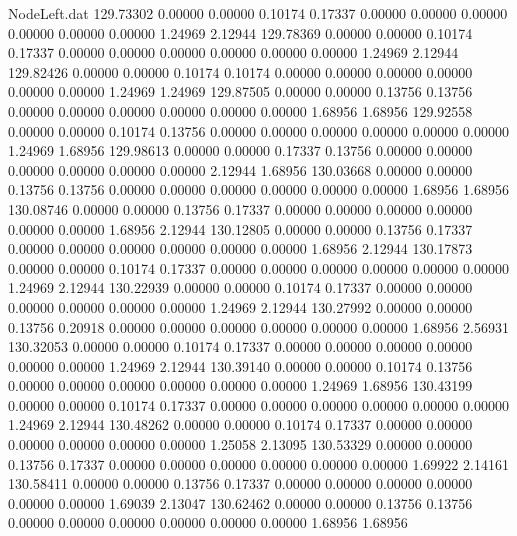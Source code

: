 \begin{filecontents}{NodeLeft.dat}
 129.73302    0.00000    0.00000     0.10174    0.17337    0.00000    0.00000    0.00000    0.00000    0.00000    0.00000    1.24969    2.12944
 129.78369    0.00000    0.00000     0.10174    0.17337    0.00000    0.00000    0.00000    0.00000    0.00000    0.00000    1.24969    2.12944
 129.82426    0.00000    0.00000     0.10174    0.10174    0.00000    0.00000    0.00000    0.00000    0.00000    0.00000    1.24969    1.24969
 129.87505    0.00000    0.00000     0.13756    0.13756    0.00000    0.00000    0.00000    0.00000    0.00000    0.00000    1.68956    1.68956
 129.92558    0.00000    0.00000     0.10174    0.13756    0.00000    0.00000    0.00000    0.00000    0.00000    0.00000    1.24969    1.68956
 129.98613    0.00000    0.00000     0.17337    0.13756    0.00000    0.00000    0.00000    0.00000    0.00000    0.00000    2.12944    1.68956
 130.03668    0.00000    0.00000     0.13756    0.13756    0.00000    0.00000    0.00000    0.00000    0.00000    0.00000    1.68956    1.68956
 130.08746    0.00000    0.00000     0.13756    0.17337    0.00000    0.00000    0.00000    0.00000    0.00000    0.00000    1.68956    2.12944
 130.12805    0.00000    0.00000     0.13756    0.17337    0.00000    0.00000    0.00000    0.00000    0.00000    0.00000    1.68956    2.12944
 130.17873    0.00000    0.00000     0.10174    0.17337    0.00000    0.00000    0.00000    0.00000    0.00000    0.00000    1.24969    2.12944
 130.22939    0.00000    0.00000     0.10174    0.17337    0.00000    0.00000    0.00000    0.00000    0.00000    0.00000    1.24969    2.12944
 130.27992    0.00000    0.00000     0.13756    0.20918    0.00000    0.00000    0.00000    0.00000    0.00000    0.00000    1.68956    2.56931
 130.32053    0.00000    0.00000     0.10174    0.17337    0.00000    0.00000    0.00000    0.00000    0.00000    0.00000    1.24969    2.12944
 130.39140    0.00000    0.00000     0.10174    0.13756    0.00000    0.00000    0.00000    0.00000    0.00000    0.00000    1.24969    1.68956
 130.43199    0.00000    0.00000     0.10174    0.17337    0.00000    0.00000    0.00000    0.00000    0.00000    0.00000    1.24969    2.12944
 130.48262    0.00000    0.00000     0.10174    0.17337    0.00000    0.00000    0.00000    0.00000    0.00000    0.00000    1.25058    2.13095
 130.53329    0.00000    0.00000     0.13756    0.17337    0.00000    0.00000    0.00000    0.00000    0.00000    0.00000    1.69922    2.14161
 130.58411    0.00000    0.00000     0.13756    0.17337    0.00000    0.00000    0.00000    0.00000    0.00000    0.00000    1.69039    2.13047
 130.62462    0.00000    0.00000     0.13756    0.13756    0.00000    0.00000    0.00000    0.00000    0.00000    0.00000    1.68956    1.68956

\end{filecontents}
